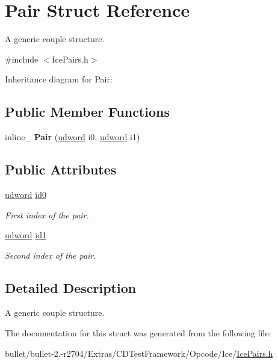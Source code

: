 \hypertarget{struct_pair}{\section{Pair Struct Reference}
\label{struct_pair}
}


A generic couple structure.  




{\ttfamily \#include $<$Ice\+Pairs.\+h$>$}



Inheritance diagram for Pair\+:
\subsection*{Public Member Functions}
\begin{DoxyCompactItemize}
\item 
\hypertarget{struct_pair_a9d050447f56957e6cdbbad4e58cc76c4}{inline\+\_\+ {\bfseries Pair} (\hyperlink{_ice_types_8h_a44c6f1920ba5551225fb534f9d1a1733}{udword} i0, \hyperlink{_ice_types_8h_a44c6f1920ba5551225fb534f9d1a1733}{udword} i1)}\label{struct_pair_a9d050447f56957e6cdbbad4e58cc76c4}

\end{DoxyCompactItemize}
\subsection*{Public Attributes}
\begin{DoxyCompactItemize}
\item 
\hypertarget{struct_pair_ac322047a2105554ef5e41472f35bea6e}{\hyperlink{_ice_types_8h_a44c6f1920ba5551225fb534f9d1a1733}{udword} \hyperlink{struct_pair_ac322047a2105554ef5e41472f35bea6e}{id0}}\label{struct_pair_ac322047a2105554ef5e41472f35bea6e}

\begin{DoxyCompactList}\small\item\em First index of the pair. \end{DoxyCompactList}\item 
\hypertarget{struct_pair_adce5fd1cb330c0c528a81ace7f5d9abc}{\hyperlink{_ice_types_8h_a44c6f1920ba5551225fb534f9d1a1733}{udword} \hyperlink{struct_pair_adce5fd1cb330c0c528a81ace7f5d9abc}{id1}}\label{struct_pair_adce5fd1cb330c0c528a81ace7f5d9abc}

\begin{DoxyCompactList}\small\item\em Second index of the pair. \end{DoxyCompactList}\end{DoxyCompactItemize}


\subsection{Detailed Description}
A generic couple structure. 

The documentation for this struct was generated from the following file\+:\begin{DoxyCompactItemize}
\item 
bullet/bullet-\/2.-\/r2704/\+Extras/\+C\+D\+Test\+Framework/\+Opcode/\+Ice/\hyperlink{_ice_pairs_8h}{Ice\+Pairs.\+h}\end{DoxyCompactItemize}

